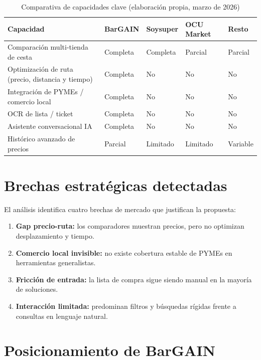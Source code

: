 \begin{table}[htbp]
\centering
\caption{Comparativa de capacidades clave (elaboraci\'on propia, marzo de 2026)}
\label{tab:comparativa-alternativas}
\small
\begin{tabular}{@{}p{5.6cm}>{\centering\arraybackslash}p{1.8cm}>{\centering\arraybackslash}p{1.8cm}>{\centering\arraybackslash}p{1.8cm}>{\centering\arraybackslash}p{1.6cm}@{}}
\toprule
\textbf{Capacidad} & \textbf{BarGAIN} & \textbf{Soysuper} & \textbf{OCU Market} & \textbf{Resto} \\
\midrule
Comparaci\'on multi-tienda de cesta & Completa & Completa & Parcial & Parcial \\
Optimizaci\'on de ruta (precio, distancia y tiempo) & Completa & No & No & No \\
Integraci\'on de PYMEs / comercio local & Completa & No & No & No \\
OCR de lista / ticket & Completa & No & No & No \\
Asistente conversacional IA & Completa & No & No & No \\
Hist\'orico avanzado de precios & Parcial & Limitado & Limitado & Variable \\
\bottomrule
\end{tabular}
\end{table}

\section{Brechas estrat\'egicas detectadas}

El an\'alisis identifica cuatro brechas de mercado que justifican la propuesta:

\begin{enumerate}
	\item \textbf{Gap precio-ruta:} los comparadores muestran precios, pero no optimizan
		desplazamiento y tiempo.
	\item \textbf{Comercio local invisible:} no existe cobertura estable de PYMEs en
		herramientas generalistas.
	\item \textbf{Fricci\'on de entrada:} la lista de compra sigue siendo manual en la mayor\'ia
		de soluciones.
	\item \textbf{Interacci\'on limitada:} predominan filtros y b\'usquedas r\'igidas frente a
		consultas en lenguaje natural.
\end{enumerate}

\section{Posicionamiento de BarGAIN}

